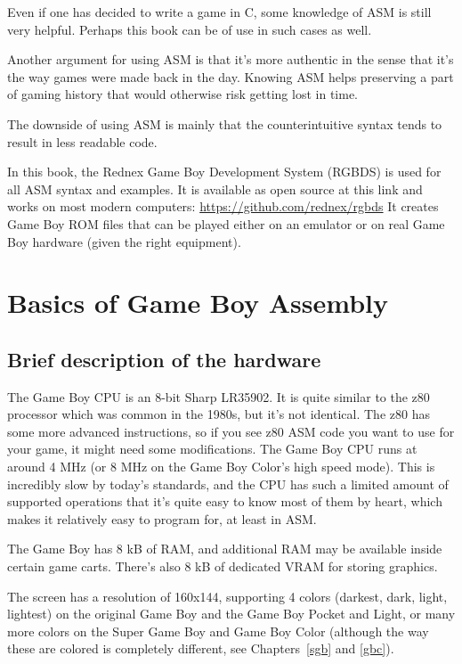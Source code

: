\documentclass[11pt]{book}
\begin{document}
Even if one has decided to write a game in C, some knowledge of ASM is still very helpful. Perhaps this book can be of use in such cases as well.

Another argument for using ASM is that it's more authentic in the sense that it's the way games were made back in the day. Knowing ASM helps preserving a part of gaming history that would otherwise risk getting lost in time.

The downside of using ASM is mainly that the counterintuitive syntax tends to result in less readable code.

In this book, the Rednex Game Boy Development System (RGBDS) is used for all ASM syntax and examples. It is available as open source at this link and works on most modern computers: \url{https://github.com/rednex/rgbds}
It creates Game Boy ROM files that can be played either on an emulator or on real Game Boy hardware (given the right equipment).

\chapter{Basics of Game Boy Assembly}
\label{basics}

\section{Brief description of the hardware} 
\label{hardware}
The Game Boy CPU is an 8-bit Sharp LR35902. It is quite similar to the z80 processor which was common in the 1980s, but it's not identical. The z80 has some more advanced instructions, so if you see z80 ASM code you want to use for your game, it might need some modifications. The Game Boy CPU runs at around 4 MHz (or 8 MHz on the Game Boy Color's high speed mode). This is incredibly slow by today's standards, and the CPU has such a limited amount of supported operations that it's quite easy to know most of them by heart, which makes it relatively easy to program for, at least in ASM.

The Game Boy has 8 kB of RAM, and additional RAM may be available inside certain game carts. There's also 8 kB of dedicated VRAM for storing graphics. 

The screen has a resolution of 160x144, supporting 4 colors (darkest, dark, light, lightest) on the original Game Boy and the Game Boy Pocket and Light, or many more colors on the Super Game Boy and Game Boy Color (although the way these are colored is completely different, see Chapters~\ref{sgb} and \ref{gbc}). 
\end{document}
